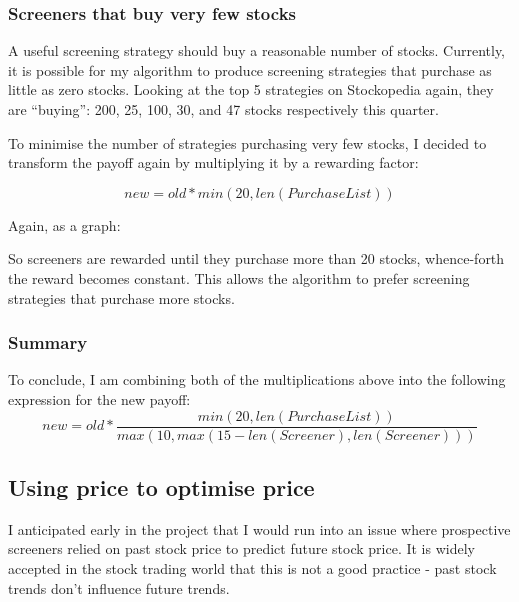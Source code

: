 \subsubsection{Screeners that buy very few stocks}
A useful screening strategy should buy a reasonable number of stocks. Currently, it is possible for my algorithm to produce screening strategies that purchase as little as zero stocks. Looking at the top 5 strategies on Stockopedia again, they are ``buying'': 200, 25, 100, 30, and 47 stocks respectively this quarter. \newline

To minimise the number of strategies purchasing very few stocks, I decided to transform the payoff again by multiplying it by a rewarding factor:

\begin{equation}
    new = old * min(20, len(PurchaseList))
\end{equation}

Again, as a graph: \newline
\begin{center}
\end{center}

So screeners are rewarded until they purchase more than 20 stocks, whence-forth the reward becomes constant. This allows the algorithm to prefer screening strategies that purchase more stocks.

\subsubsection{Summary}
To conclude, I am combining both of the multiplications above into the following expression for the new payoff:
\begin{equation}
    new = old * 
    \frac{min(20, len(PurchaseList))}{max(10, max(15 - len(Screener), len(Screener)))}
\end{equation}

\subsection{Using price to optimise price}
I anticipated early in the project that I would run into an issue where prospective screeners relied on past stock price to predict future stock price. It is widely accepted in the stock trading world that this is not a good practice - past stock trends don't influence future trends. \cite{weakFormEfficiency} \newline

